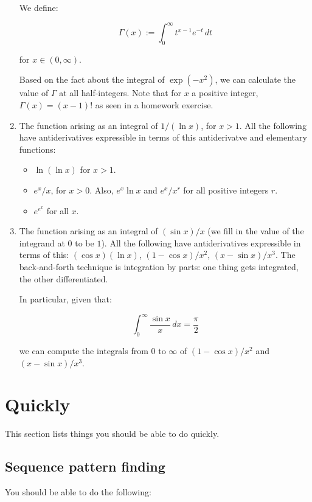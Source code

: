\documentclass[10pt]{amsart}
\begin{document}
\begin{enumerate}
  We define:

  $$\Gamma(x) := \int_0^\infty t^{x - 1}e^{-t} \, dt$$

  for $x \in (0,\infty)$.

  Based on the fact about the integral of $\exp(-x^2)$, we can
  calculate the value of $\Gamma$ at all half-integers. Note that for
  $x$ a positive integer, $\Gamma(x) = (x - 1)!$ as seen in a homework
  exercise.

\item The function arising as an integral of $1/(\ln x)$, for $x >
  1$. All the following have antiderivatives expressible in terms of
  this antiderivatve and elementary functions:

  \begin{itemize}
  \item $\ln(\ln x)$ for $x > 1$.
  \item $e^x/x$, for $x > 0$. Also, $e^x\ln x$ and $e^x/x^r$ for all
    positive integers $r$.
  \item $e^{e^x}$ for all $x$.
  \end{itemize}

\item The function arising as an integral of $(\sin x)/x$ (we fill in
  the value of the integrand at $0$ to be $1$). All the following have
  antiderivatives expressible in terms of this: $(\cos x)(\ln x)$, $(1
  - \cos x)/x^2$, $(x - \sin x)/x^3$. The back-and-forth technique is
  integration by parts: one thing gets integrated, the other
  differentiated.

  In particular, given that:

  $$\int_0^\infty \frac{\sin x}{x} \, dx = \frac{\pi}{2}$$

  we can compute the integrals from $0$ to $\infty$ of $(1 - \cos
  x)/x^2$ and $(x - \sin x)/x^3$.
\end{enumerate}

\section{Quickly}

This section lists things you should be able to do quickly.

\subsection{Sequence pattern finding}

You should be able to do the following:
\end{document}

